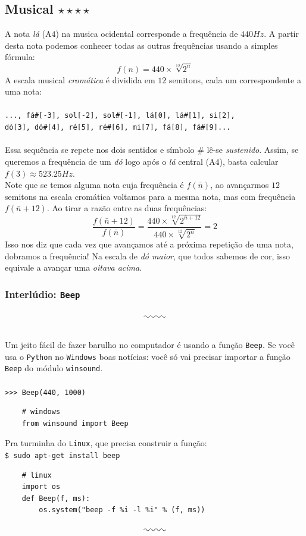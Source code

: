 \documentclass[12pt]{article}
\newcommand{\mono}[1]{\texttt{#1}}
\newcommand{\inter}[0]{\[\photon\]\\}
\begin{document}
	\subsection{Musical $\star\star\star\star$}
	A nota \emph{lá} (A$4$) na musica ocidental corresponde a frequência de $440 Hz$. A partir desta nota podemos conhecer todas as outras frequências usando a simples fórmula:
	\[f(n) = 440 \times \sqrt[12]{2^{n}}\]
	A escala musical \emph{cromática} é dividida em $12$ semitons, cada um correspondente a uma nota:\\
	\\
	\mono{..., fá\#[-3], sol[-2], sol\#[-1], lá[0], lá\#[1], si[2],}\\ \mono{dó[3], dó\#[4], ré[5], ré\#[6], mi[7], fá[8], fá\#[9]...}\\
	\\
	Essa sequência se repete nos dois sentidos e símbolo \# lê-se \emph{sustenido}. Assim, se queremos a frequência de um \emph{dó} logo após o \emph{lá} central (A$4$), basta calcular $f(3) \approx 523.25 Hz$.\\
	Note que se temos alguma nota cuja frequência é $f(\bar{n})$, ao avançarmos $12$ semitons na escala cromática voltamos para a mesma nota, mas com frequência $f(\bar{n} + 12)$. Ao tirar a razão entre as duas frequências:
	\[\frac{f(\bar{n} + 12)}{f(\bar{n})} = \frac{440 \times \sqrt[12]{2^{\bar{n} + 12}}}{440 \times \sqrt[12]{2^{\bar{n}}}} = 2\]
	Isso nos diz que cada vez que avançamos até a próxima repetição de uma nota, dobramos a frequência! Na escala de \emph{dó maior}, que todos sabemos de cor, isso equivale a avançar uma \emph{oitava acima}.
	
	\subsubsection{Interlúdio: \mono{Beep}}
	\inter
	Um jeito fácil de fazer barulho no computador é usando a função \mono{Beep}. Se você usa o \mono{Python} no \mono{Windows} boas notícias: você só vai precisar importar a função \mono{Beep} do módulo \mono{winsound}.\\
	\\
	\mono{>>> Beep(440, 1000)}
	\begin{verbatim}
	# windows
	from winsound import Beep
	\end{verbatim}
	Pra turminha do \mono{Linux}, que precisa construir a função: \\
	\mono{\$ sudo apt-get install beep}
	\begin{verbatim}
	# linux
	import os
	def Beep(f, ms):
	    os.system("beep -f %i -l %i" % (f, ms))
	\end{verbatim}
	\inter
	
\end{document}
